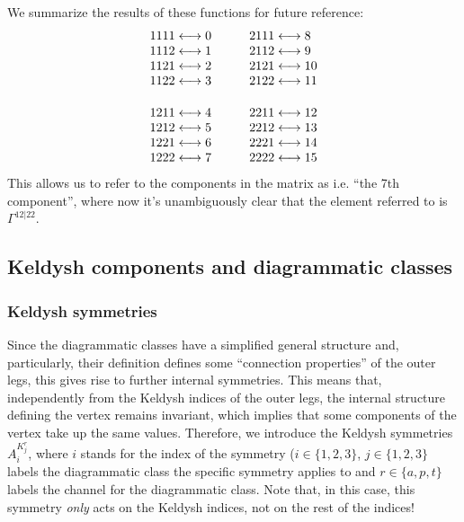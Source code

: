 \documentclass[12pt,a4paper,roman]{article}
\begin{document}
We summarize the results of these functions for future reference:
\begin{align}
    \begin{array}{r@{\mskip\thickmuskip}l}
    1111 &\longleftrightarrow 0 \\
    1112 &\longleftrightarrow 1 \\
    1121 &\longleftrightarrow 2 \\
    1122 &\longleftrightarrow 3 \\
    \vspace{0.05cm}\\
    1211 &\longleftrightarrow 4 \\
    1212 &\longleftrightarrow 5 \\
    1221 &\longleftrightarrow 6 \\
    1222 &\longleftrightarrow 7
    \end{array} 
  \quad  \quad
  \begin{array}{l@{\mskip\thickmuskip}l}
    2111 &\longleftrightarrow 8 \\
    2112 &\longleftrightarrow 9 \\
    2121 &\longleftrightarrow 10 \\
    2122 &\longleftrightarrow 11 \\
    \vspace{0.05cm}\\
    2211 &\longleftrightarrow 12 \\
    2212 &\longleftrightarrow 13 \\
    2221 &\longleftrightarrow 14 \\
    2222 &\longleftrightarrow 15
  \end{array}
\end{align}
This allows us to refer to the components in the matrix as i.e. ``the 7th component'', where now it's unambiguously clear that the element referred to is $\Gamma^{12|22}$.


\subsection*{Keldysh components and diagrammatic classes}
\subsubsection*{Keldysh symmetries}
Since the diagrammatic classes have a simplified general structure and, particularly, their definition defines some ``connection properties'' of the outer legs, this gives rise to further internal symmetries. This means that, independently from the Keldysh indices of the outer legs, the internal structure defining the vertex remains invariant, which implies that some components of the vertex take up the same values.
Therefore, we introduce the Keldysh symmetries $A_i^{K^r_j}$, where $i$ stands for the index of the symmetry ($i \in \{1,2,3\}$, $j\in\{1,2,3\}$ labels the diagrammatic class the specific symmetry applies to and $r\in\{a, p, t\}$ labels the channel for the diagrammatic class. Note that, in this case, this symmetry \textit{only} acts on the Keldysh indices, not on the rest of the indices!
\end{document}
